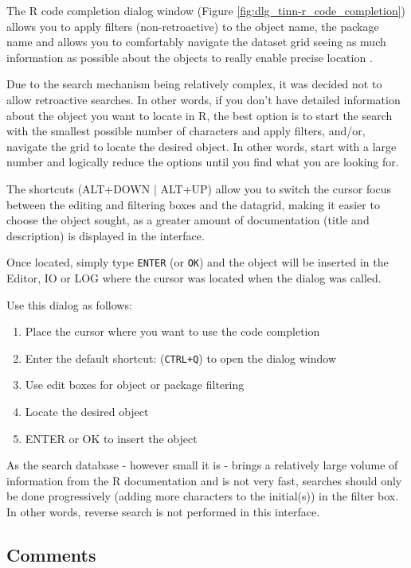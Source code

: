 The R code completion dialog window (Figure \ref{fig:dlg_tinn-r_code_completion}) allows you to apply filters
(non-retroactive) to the object name, the package name and allows you to comfortably navigate the dataset
grid seeing as much information as possible about the objects to really enable precise location .

Due to the search mechanism being relatively complex, it was decided not to allow retroactive searches.
In other words, if you don't have detailed information about the object you want to locate in R, the best
option is to start the search with the smallest possible number of characters and apply filters, and/or,
navigate the grid to locate the desired object. In other words, start with a large number and logically
reduce the options until you find what you are looking for.

The shortcuts (ALT+DOWN | ALT+UP) allow you to switch the cursor focus between the editing and filtering
boxes and the datagrid, making it easier to choose the object sought, as a greater amount of documentation
(title and description) is displayed in the interface.

Once located, simply type \texttt{ENTER} (or \texttt{OK}) and the object will be inserted in the Editor,
IO or LOG where the cursor was located when the dialog was called.

Use this dialog as follows:
\begin{enumerate}
  \item Place the cursor where you want to use the code completion
  \item Enter the default shortcut: (\texttt{CTRL+Q}) to open the dialog window
  \item Use edit boxes for object or package filtering
  \item Locate the desired object
  \item ENTER or OK to insert the object
\end{enumerate}

As the search database - however small it is - brings a relatively large volume of information
from the R documentation and is not very fast, searches should only be done progressively
(adding more characters to the initial(s)) in the filter box. In other words, reverse search
is not performed in this interface.


\hypertarget{dlg_working_about}{}
\subsection{Comments}

